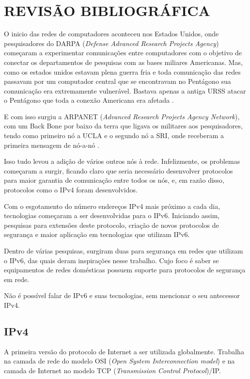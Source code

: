 \chapter{REVISÃO BIBLIOGRÁFICA}\label{ch:rev-bibs}

O inicio das redes de computadores aconteceu nos Estados Unidos, onde pesquisadores do DARPA (\textit{Defense Advanced Research Projects Agency}) começaram a experimentar comunicações entre computadores com o objetivo de conectar os departamentos de pesquisas com as bases miliares Americanas. Mas, como os estados unidos estavam plena guerra fria e toda comunicação das redes passavam por um computador central que se encontravam no Pentágono sua comunicação era extremamente vulnerável. Bastava apenas a antiga URSS atacar o Pentágono que toda a conexão Americana era afetada \cite{furb-ipv6}.

E com isso surgiu a ARPANET (\textit{Advanced Research Projects Agency Network}), com um Back Bone por baixo da terra que ligava os militares aos pesquisadores, tendo como primeiro nó a UCLA e o segundo nó a SRI, onde receberam a primeira mensagem de nó-a-nó \cite{comeco-internet}.

Isso tudo levou a adição de vários outros nós à rede. Infelizmente, os problemas começaram a surgir, ficando claro que seria necessário desenvolver protocolos para maior garantia de comunicação entre todos os nós, e, em razão disso, protocolos como o IPv4 foram desenvolvidos.

Com o esgotamento do número endereços IPv4 mais próximo a cada dia, tecnologias começaram a ser desenvolvidas para o IPv6. Iniciando assim, pesquisas para extensões deste protocolo, criação de novos protocolos de segurança e maior aplicação em tecnologias que utilizam IPv6.

Dentro de várias pesquisas, surgiram duas para segurança em redes que utilizam o IPv6, das quais deram inspirações nesse trabalho. Cujo foco é saber se equipamentos de redes domésticas possuem suporte para protocolos de segurança em rede.

Não é possível falar de IPv6 e suas tecnologias, sem mencionar o seu antecessor IPv4.

\section{IPv4}\label{sec:protIPv4}

A primeira versão do protocolo de Internet a ser utilizada globalmente. Trabalha na camada de rede do modelo OSI (\textit{Open System Interconnection model}) e na camada de Internet no modelo TCP (\textit{Transmission Control Protocol})/IP.

